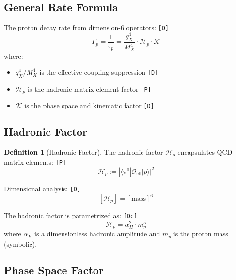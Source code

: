 \documentclass[11pt,a4paper]{article}
\newcommand{\tagD}{\textcolor{green!50!black}{\texttt{[D]}}}
\newcommand{\tagDc}{\textcolor{blue!70!black}{\texttt{[Dc]}}}
\newcommand{\tagP}{\textcolor{orange!80!black}{\texttt{[P]}}}
\theoremstyle{definition}
\newtheorem{definition}{Definition}[section]
\begin{document}
\subsection{General Rate Formula}
\label{subsec:general-rate}

The proton decay rate from dimension-6 operators: \tagD{}
\begin{equation}
\label{eq:general-rate}
\Gamma_p = \frac{1}{\tau_p} = \frac{g_X^4}{M_X^4} \cdot \mathcal{H}_p \cdot \mathcal{K}
\end{equation}
where:
\begin{itemize}
  \item $g_X^4/M_X^4$ is the effective coupling suppression \tagD{}
  \item $\mathcal{H}_p$ is the hadronic matrix element factor \tagP{}
  \item $\mathcal{K}$ is the phase space and kinematic factor \tagD{}
\end{itemize}

\subsection{Hadronic Factor}
\label{subsec:hadronic-factor}

\begin{definition}[Hadronic Factor]
\label{def:hadronic-factor}
The hadronic factor $\mathcal{H}_p$ encapsulates QCD matrix elements: \tagP{}
\begin{equation}
\label{eq:hadronic-def}
\mathcal{H}_p := |\langle \pi^0 | \mathcal{O}_{\text{eff}} | p \rangle|^2
\end{equation}
\end{definition}

Dimensional analysis: \tagD{}
\begin{equation}
\label{eq:hadronic-dimension}
[\mathcal{H}_p] = [\text{mass}]^6
\end{equation}

The hadronic factor is parametrized as: \tagDc{}
\begin{equation}
\label{eq:hadronic-param}
\mathcal{H}_p = \alpha_H^2 \cdot m_p^5
\end{equation}
where $\alpha_H$ is a dimensionless hadronic amplitude and $m_p$ is the proton mass (symbolic).

\subsection{Phase Space Factor}
\label{subsec:phase-space}
\end{document}
